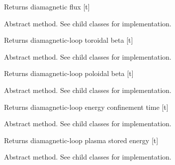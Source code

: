 \documentclass[letterpaper,10pt,english]{sphinxmanual}
\begin{document}
\begin{fulllineitems}
\begin{fulllineitems}
Returns diamagnetic flux {[}t{]}

\end{fulllineitems}


\begin{fulllineitems}
\label{eqtools:eqtools.core.Equilibrium.getDiamagBetaT}
Abstract method.  See child classes for implementation.

Returns diamagnetic-loop toroidal beta {[}t{]}

\end{fulllineitems}


\begin{fulllineitems}
\label{eqtools:eqtools.core.Equilibrium.getDiamagBetaP}
Abstract method.  See child classes for implementation.

Returns diamagnetic-loop poloidal beta {[}t{]}

\end{fulllineitems}


\begin{fulllineitems}
\label{eqtools:eqtools.core.Equilibrium.getDiamagTauE}
Abstract method.  See child classes for implementation.

Returns diamagnetic-loop energy confinement time {[}t{]}

\end{fulllineitems}


\begin{fulllineitems}
\label{eqtools:eqtools.core.Equilibrium.getDiamagWp}
Abstract method.  See child classes for implementation.

Returns diamagnetic-loop plasma stored energy {[}t{]}

\end{fulllineitems}


\begin{fulllineitems}
\label{eqtools:eqtools.core.Equilibrium.getDiamag}
Abstract method.  See child classes for implementation.


\end{fulllineitems}
\end{fulllineitems}
\end{document}
